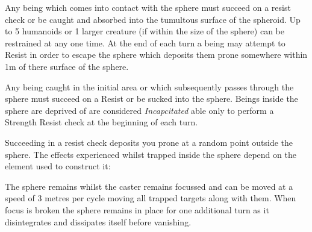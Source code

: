 \begin{multicols}{3}
{Any being which comes into contact with the sphere must succeed on a resist check\comma{} or be caught and absorbed into the tumultous surface of the spheroid. Up to 5 humanoids\comma{} or 1 larger creature (if within the size of the sphere) can be restrained at any one time. At the end of each turn\comma{} a being may attempt to Resist in order to escape the sphere\comma{} which deposits them prone somewhere within 1m of there surface of the sphere. 

Any being caught in the initial area\comma{} or which subsequently passes through the sphere must succeed on a Resist\comma{} or be sucked into the sphere.  Beings inside the sphere are deprived of are considered {\it Incapcitated}\comma{} able only to perform a Strength Resist check at the beginning of each turn. 

Succeeding in a resist check deposits you prone at a random point outside the sphere. The effects experienced whilst trapped inside the sphere depend on the element used to construct it:

\begin{spellitemize}
\end{spellitemize}

The sphere remains whilst the caster remains focussed\comma{} and can be moved at a speed of 3 metres per cycle\comma{} moving all trapped targets along with them. When focus is broken\comma{} the sphere remains in place for one additional turn as it disintegrates and dissipates itself\comma{} before vanishing.
}





\end{multicols}

